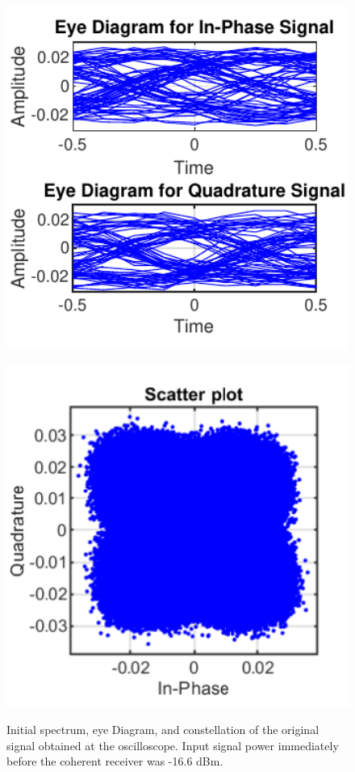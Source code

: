 \begin{figure}[H]
\begin{minipage}{0.3\textwidth}
			\includegraphics[width=1\textwidth]
			{./sdf/m_qam_system/figures/experimental/results/DSP_homodyne/0noEDFA_16_homodyne_16_6_eye.pdf}
			\label{fig:16GBdSpecBefFecHm}
		\end{minipage}
		\begin{minipage}{0.3\textwidth}
			\centering
			\includegraphics[width=1\textwidth]
			{./sdf/m_qam_system/figures/experimental/results/DSP_homodyne/0noEDFA_16_homodyne_16_6_const.pdf}\\
			\label{fig:16GBdSpecBefFecCHm}
		\end{minipage}
		\caption{Initial spectrum, eye Diagram, and constellation of the original
			signal obtained at the oscilloscope. Input signal power immediately before the
		coherent receiver was -16.6 dBm.}
		\label{fig:16GBdinitHm}
	\end{figure}


